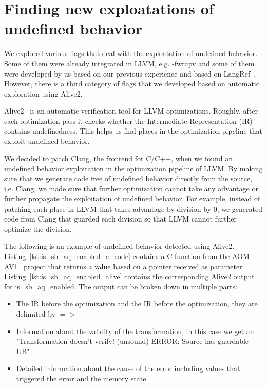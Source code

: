 \section{Finding new exploatations of undefined behavior}

We explored various flags that deal with the exploatation of undefined behavior.
Some of them were already integrated in LLVM, e.g. -fwrapv and some of them were
developed by us based on our previous experience and based on
LangRef~\cite{langref}. However, there is a third category of flags that we
developed based on automatic exploration using Alive2.

Alive2~\cite{lopes2021alive2} is an automatic verification tool for LLVM
optimizations. Roughly, after each optimization pass it checks whether the
Intermediate Representation (IR) contains undefinedness. This helps us find
places in the optimization pipeline that exploit undefined behavior.

We decided to patch Clang, the frontend for C/C++, when we found an undefined
behavior exploitation in the optimization pipeline of LLVM. By making sure that
we generate code free of undefined behavior directly from the source, i.e.
Clang, we made sure that further optimization cannot take any advantage or
further propagate the exploitation of undefined behavior. For example, instead
of patching each place in LLVM that takes advantage by division by 0, we
generated code from Clang that guarded each division so that LLVM cannot further
optimize the division.


The following is an example of undefined behavior detected using Alive2.
Listing~\ref{lst:is_sb_aq_enabled_c_code} contains a C function from the
AOM-AV1~ project that returns a value based on a pointer received as
parameter. Listing~\ref{lst:is_sb_aq_enabled_alive} contains the corresponding
Alive2 output for is_sb_aq_enabled. The output can be broken down in multiple
parts:
\begin{itemize}
  \item The IR before the optimization and the IR before the optimization, they
are delimited by \(=>\)
  \item Information about the validity of the transformation, in this case we
get an "Transformation doesn't verify! (unsound) ERROR: Source has guardable UB"
  \item Detailed information about the cause of the error including values that
triggered the error and the memory state
\end{itemize}

